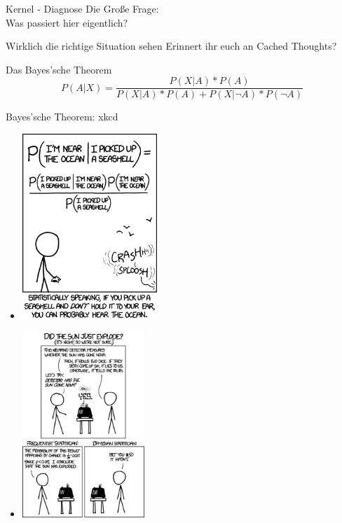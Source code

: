 \begin{frame}[c]{Kernel - Diagnose}
    \Huge
    Die Große Frage: \\
    \pause
    Was passiert hier eigentlich?
\end{frame}


\begin{frame}[c]{Wirklich die richtige Situation sehen}
    \Huge
    Erinnert ihr euch an Cached Thoughts?
\end{frame}


\begin{frame}[c]{Das Bayes'sche Theorem}
    \Large
    \[
        P(A|X) = \frac{P(X|A) * P(A)}{P(X|A) * P(A) + P(X|\neg A) * P(\neg A)}
    \]
\end{frame}


\begin{frame}[c]{Bayes'sche Theorem: xkcd}
    \begin{multicols}{2}
    \begin{itemize}
        \item[]<1> \includegraphics[height=7cm]{strategy/xkcd_seashell.png}
        \item[]<2> \includegraphics[height=7cm]{strategy/xkcd_frequentists_vs_bayesians.png}
    \end{itemize}
    \end{multicols}
\end{frame}


